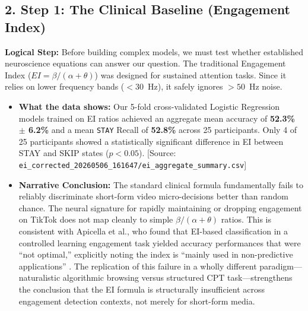 \documentclass[12pt,a4paper]{report}
\begin{document}
\subsection{2. Step 1: The Clinical Baseline (Engagement Index)}
\textbf{Logical Step:} Before building complex models, we must test whether established neuroscience equations can answer our question. The traditional Engagement Index ($EI = \beta / (\alpha + \theta)$) was designed for sustained attention tasks. Since it relies on lower frequency bands ($<30$~Hz), it safely ignores $>50$~Hz noise.
\begin{itemize}
    \item \textbf{What the data shows:} Our 5-fold cross-validated Logistic Regression models trained on EI ratios achieved an aggregate mean accuracy of \textbf{52.3\% $\pm$ 6.2\%} and a mean \texttt{STAY} Recall of \textbf{52.8\%} across 25 participants. Only 4 of 25 participants showed a statistically significant difference in EI between STAY and SKIP states ($p<0.05$). [Source: \verb|ei_corrected_20260506_161647/ei_aggregate_summary.csv|]
    \item \textbf{Narrative Conclusion:} The standard clinical formula fundamentally fails to reliably discriminate short-form video micro-decisions better than random chance. The neural signature for rapidly maintaining or dropping engagement on TikTok does not map cleanly to simple $\beta / (\alpha + \theta)$ ratios. This is consistent with Apicella et al., who found that EI-based classification in a controlled learning engagement task yielded accuracy performances that were ``not optimal,'' explicitly noting the index is ``mainly used in non-predictive applications'' \cite{apicella_eeg-based_2022}. The replication of this failure in a wholly different paradigm---naturalistic algorithmic browsing versus structured CPT task---strengthens the conclusion that the EI formula is structurally insufficient across engagement detection contexts, not merely for short-form media.
\end{itemize}
\end{document}
